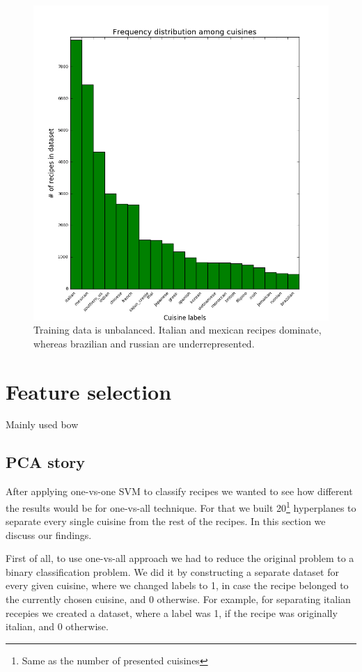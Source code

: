 \documentclass[prodmode,acmtap]{acmlarge}
\begin{document}
\begin{figure}[tp]
\centering
\includegraphics[scale=0.2]{cuisine_freq_hist_green_wlabels}
\caption{Training data is unbalanced. Italian and mexican recipes dominate, whereas brazilian and russian are underrepresented.}
\label{cuisine_freq}
\end{figure}

\section{Feature selection}
Mainly used bow
\subsection{PCA story}
After applying one-vs-one SVM to classify recipes we wanted to see how different the results would be for one-vs-all technique. For that we built 20\footnote{Same as the number of presented cuisines} hyperplanes to separate every single cuisine from the rest of the recipes. In this section we discuss our findings. 

First of all, to use one-vs-all approach we had to reduce the original problem to a binary classification problem. We did it by constructing a separate dataset for every given cuisine, where we changed labels to 1, in case the recipe belonged to the currently chosen cuisine, and 0 otherwise. For example, for separating italian recepies we created a dataset, where a label was 1, if the recipe was originally italian, and 0 otherwise. 
\end{document}
